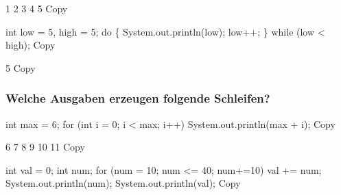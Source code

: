 \documentclass[
]{article}
\newenvironment{Shaded}{}{}
\newcommand{\NormalTok}[1]{#1}
\begin{document}
\begin{Shaded}
\begin{Highlighting}[]
\NormalTok{1}
\NormalTok{2}
\NormalTok{3}
\NormalTok{4}
\NormalTok{5}
\NormalTok{Copy}
\end{Highlighting}
\end{Shaded}

\begin{Shaded}
\begin{Highlighting}[]
\NormalTok{int low = 5, high = 5;}
\NormalTok{do \{}
\NormalTok{    System.out.println(low);}
\NormalTok{    low++;}
\NormalTok{\} while (low \textless{} high);}
\NormalTok{Copy}
\end{Highlighting}
\end{Shaded}

\begin{Shaded}
\begin{Highlighting}[]
\NormalTok{5}
\NormalTok{Copy}
\end{Highlighting}
\end{Shaded}

\subsubsection{Welche Ausgaben erzeugen folgende
Schleifen?}\label{welche-ausgaben-erzeugen-folgende-schleifen}

\begin{Shaded}
\begin{Highlighting}[]
\NormalTok{int max = 6;}
\NormalTok{for (int i = 0; i \textless{} max; i++)}
\NormalTok{    System.out.println(max + i);}
\NormalTok{Copy}
\end{Highlighting}
\end{Shaded}

\begin{Shaded}
\begin{Highlighting}[]
\NormalTok{6}
\NormalTok{7}
\NormalTok{8}
\NormalTok{9}
\NormalTok{10}
\NormalTok{11}
\NormalTok{Copy}
\end{Highlighting}
\end{Shaded}

\begin{Shaded}
\begin{Highlighting}[]
\NormalTok{int val = 0;}
\NormalTok{int num;}
\NormalTok{for (num = 10; num \textless{}= 40; num+=10)}
\NormalTok{    val += num;}
\NormalTok{System.out.println(num);}
\NormalTok{System.out.println(val);}
\NormalTok{Copy}
\end{Highlighting}
\end{Shaded}
\end{document}
